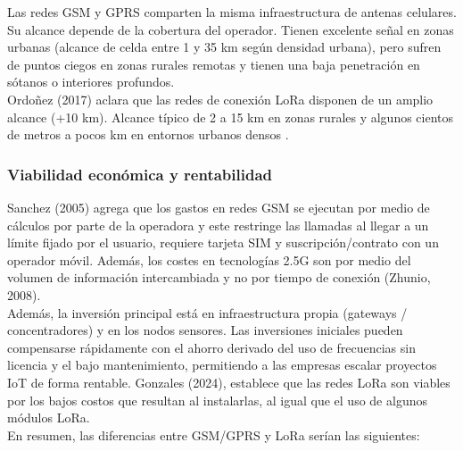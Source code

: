\documentclass[12pt,a4paper]{article}
\begin{document}
	Las redes GSM y GPRS comparten la misma infraestructura de antenas celulares. Su alcance depende de la cobertura del operador. Tienen excelente señal en zonas urbanas (alcance de celda entre 1 y 35 km según densidad urbana), pero sufren de puntos ciegos en zonas rurales remotas y tienen una baja penetración en sótanos o interiores profundos.\\
	
	Ordoñez (2017) aclara que las redes de conexión LoRa disponen de un amplio alcance (+10 km). Alcance típico de 2 a 15 km en zonas rurales y algunos cientos de metros a pocos km en entornos urbanos densos .

	\subsubsection{Viabilidad económica y rentabilidad}
	
	Sanchez (2005) agrega que los gastos en redes GSM se ejecutan por medio de cálculos por parte de la operadora y este restringe las llamadas al llegar a un límite fijado por el usuario, requiere tarjeta SIM y suscripción/contrato con un operador móvil. Además, los costes en tecnologías 2.5G son  por medio del volumen de información intercambiada y no por tiempo de conexión (Zhunio, 2008). \\
	
	Además, la inversión principal está en infraestructura propia (gateways / concentradores) y en los nodos sensores. Las inversiones iniciales pueden compensarse rápidamente con el ahorro derivado del uso de frecuencias sin licencia y el bajo mantenimiento, permitiendo a las empresas escalar proyectos IoT de forma rentable. Gonzales (2024), establece que las redes LoRa son viables por los bajos costos que resultan al instalarlas, al igual que el uso de algunos módulos LoRa.\\

	En resumen, las diferencias entre GSM/GPRS y LoRa serían las siguientes:\\
	
\end{document}
